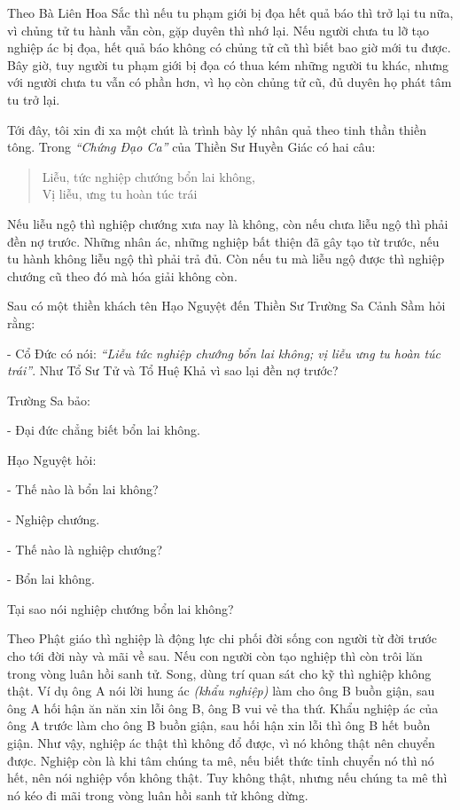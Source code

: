 \documentclass[
  12pt,
  oneside]{book}
\begin{document}
Theo Bà Liên Hoa Sắc thì nếu tu phạm giới bị đọa hết quả báo thì trở lại tu nữa, vì chủng tử tu hành vẫn còn, gặp duyên thì nhớ lại. Nếu người chưa tu lỡ tạo nghiệp ác bị đọa, hết quả báo không có chủng tử cũ thì biết bao giờ mới tu được. Bây giờ, tuy người tu phạm giới bị đọa có thua kém những người tu khác, nhưng với người chưa tu vẫn có phần hơn, vì họ còn chủng tử cũ, đủ duyên họ phát tâm tu trở lại.

Tới đây, tôi xin đi xa một chút là trình bày lý nhân quả theo tinh thần thiền tông. Trong \emph{``Chứng Đạo Ca''} của Thiền Sư Huyền Giác có hai câu:

\begin{quote}
Liễu, tức nghiệp chướng bổn lai không,\\
Vị liễu, ưng tu hoàn túc trái
\end{quote}

Nếu liễu ngộ thì nghiệp chướng xưa nay là không, còn nếu chưa liễu ngộ thì phải đền nợ trước. Những nhân ác, những nghiệp bất thiện đã gây tạo từ trước, nếu tu hành không liễu ngộ thì phải trả đủ. Còn nếu tu mà liễu ngộ được thì nghiệp chướng cũ theo đó mà hóa giải không còn.

Sau có một thiền khách tên Hạo Nguyệt đến Thiền Sư Trường Sa Cảnh Sầm hỏi rằng:

- Cổ Đức có nói: \emph{``Liễu tức nghiệp chướng bổn lai không; vị liễu ưng tu hoàn túc trái''}. Như Tổ Sư Tử và Tổ Huệ Khả vì sao lại đền nợ trước?

Trường Sa bảo:

- Đại đức chẳng biết bổn lai không.

Hạo Nguyệt hỏi:

- Thế nào là bổn lai không?

- Nghiệp chướng.

- Thế nào là nghiệp chướng?

- Bổn lai không.

Tại sao nói nghiệp chướng bổn lai không?

Theo Phật giáo thì nghiệp là động lực chi phối đời sống con người từ đời trước cho tới đời này và mãi về sau. Nếu con người còn tạo nghiệp thì còn trôi lăn trong vòng luân hồi sanh tử. Song, dùng trí quan sát cho kỹ thì nghiệp không thật. Ví dụ ông A nói lời hung ác \emph{(khẩu nghiệp)} làm cho ông B buồn giận, sau ông A hối hận ăn năn xin lỗi ông B, ông B vui vẻ tha thứ. Khẩu nghiệp ác của ông A trước làm cho ông B buồn giận, sau hối hận xin lỗi thì ông B hết buồn giận. Như vậy, nghiệp ác thật thì không đổ được, vì nó không thật nên chuyển được. Nghiệp còn là khi tâm chúng ta mê, nếu biết thức tỉnh chuyển nó thì nó hết, nên nói nghiệp vốn không thật. Tuy không thật, nhưng nếu chúng ta mê thì nó kéo đi mãi trong vòng luân hồi sanh tử không dừng.
\end{document}
